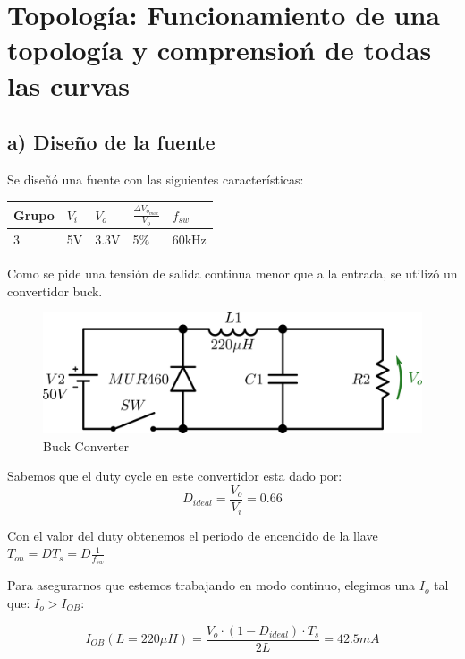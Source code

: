 \documentclass[e4_tp1_main.tex]{subfiles}
\begin{document}
\section{Topolog\'ia: Funcionamiento de una topolog\'ia y comprensio\'n de todas las curvas}

\subsection*{a) Diseño de la fuente} 

Se diseñ\'o una fuente con las siguientes caracter\'isticas:

\begin{table}[H]
\centering
\begin{tabular}{|l|l|l|l|l|}
\hline
\multicolumn{1}{|c|}{Grupo}  & $V_{i}$ & $V_{o}$  & $\frac{\Delta V_{o_{max}}}{V_o}$ & $f_{sw}$ \\ \hline
3     						& 5V     & 3.3V  & 5\%   & 60kHz  \\ \hline
\end{tabular}
\label{tabla:datos de la fuente}
\end{table} 



Como se pide una tensi\'on de salida continua menor que a la entrada, se utiliz\'o un convertidor buck. 


\begin{figure}[H]
  \centering
    \includegraphics[scale = 0.8]{Imagenes/punto2/Circuito2.png}
  \caption{Buck Converter}
  \label{Circuito}
\end{figure}




Sabemos que el duty cycle en este convertidor esta dado por: 
$$D_{ideal}=\frac{V_o}{V_i}=0.66$$

Con el valor del duty obtenemos el periodo de encendido de la llave $T_{on}=D T_s=D \frac{1}{f_{sw}}$


Para asegurarnos que estemos trabajando en modo continuo, elegimos una $I_{o}$ tal que: $I_{o}>I_{OB}$:

\[
I_{OB}(L=220\mu H) = \frac{V_o \cdot (1-D_{ideal}) \cdot T_s}{2L} = 42.5mA
\]
\end{document}
